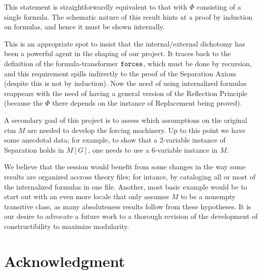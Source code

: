 This statement is straightforwardly equivalent to that with $\Phi$
consisting of a single formula. The schematic nature of this result
hints at a proof by induction on formulas, and hence it must be shown
internally. 

This  is an appropriate spot to insist that the internal/external
dichotomy has been a powerful agent in the shaping of our
project. It traces back to the definition of the formula-transformer
$\mathop{\mathtt{forces}}$, which must be done by recursion, and this requirement
spills indirectly to the proof of the Separation Axiom (despite this
is not by induction). Now the need of using internalized formulas
reappears with the need of having a general version of the Reflection
Principle (because the $\Phi$ there depends on the instance of Replacement
being proved).

A secondary goal of this project is to assess which assumptions on the
original ctm $M$ are needed to develop the forcing machinery. Up to this
point we have some anecdotal data; for example, to show that a
2-variable instance of Separation holds in $M[G]$, one needs to use a
6-variable instance in $M$. 

We believe that the
 session  would benefit from some changes in
the way some results are organized accross theory files; for
intance, by cataloging all or most of the internalized formulas in one
file. Another, most basic example would be to start out with an even
more locale that only assumes $M$ to be a nonempty transitive class,
as many absoluteness results follow from these hypotheses.  
It is our desire to advocate a future work to a thorough
revision of the development of constructibility to maximize modularity.

\section*{Acknowledgment}


